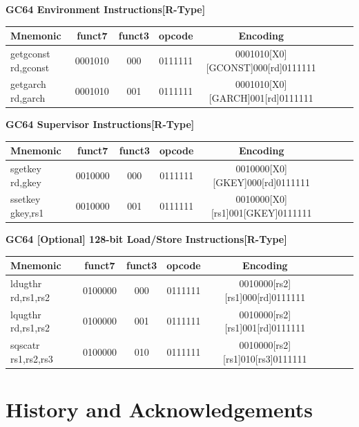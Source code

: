 \documentclass{article}
\begin{document}
\begin{center}
\begin{small}
\vspace{10 mm}

\textbf{GC64 Environment Instructions[R-Type]}
\begin{tabular}{| l | c | c | c | c | c | c || r}
\hline
Mnemonic & funct7 & funct3 & opcode & Encoding \\ \hline
\hline
getgconst rd,gconst & 0001010 & 000 & 0111111 & 0001010[X0][GCONST]000[rd]0111111 \\ 
\hline
getgarch rd,garch & 0001010 & 001 & 0111111 & 0001010[X0][GARCH]001[rd]0111111 \\ 
\hline
\end{tabular}

\vspace{10 mm}

\textbf{GC64 Supervisor Instructions[R-Type]}
\begin{tabular}{| l | c | c | c | c | c | c || r}
\hline
Mnemonic & funct7 & funct3 & opcode & Encoding \\ \hline
\hline
sgetkey rd,gkey & 0010000 & 000 & 0111111 & 0010000[X0][GKEY]000[rd]0111111 \\ 
\hline
ssetkey gkey,rs1 & 0010000 & 001 & 0111111 & 0010000[X0][rs1]001[GKEY]0111111 \\ 
\hline
\end{tabular}

\vspace{10 mm}

\textbf{GC64 [Optional] 128-bit Load/Store Instructions[R-Type]}
\begin{tabular}{| l | c | c | c | c | c | c || r}
\hline
Mnemonic & funct7 & funct3 & opcode & Encoding \\ \hline
\hline
ldugthr rd,rs1,rs2 & 0100000 & 000 & 0111111 & 0010000[rs2][rs1]000[rd]0111111 \\ 
\hline
lqugthr rd,rs1,rs2 & 0100000 & 001 & 0111111 & 0010000[rs2][rs1]001[rd]0111111 \\ 
\hline
sqscatr rs1,rs2,rs3 & 0100000 & 010 & 0111111 & 0010000[rs2][rs1]010[rs3]0111111 \\ 
\hline
\end{tabular}

\end{small}
\end{center}


\section{History and Acknowledgements}
\end{document}
